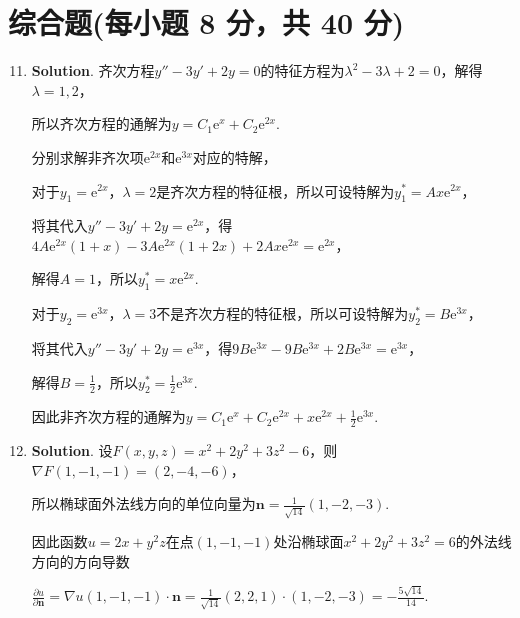 \documentclass[../main.tex]{subfiles}
\begin{document}
\section{综合题(每小题 8 分，共 40 分)}
\begin{enumerate}
    \setcounter{enumi}{10}

    \item \textbf{Solution}. 齐次方程$y''-3y'+2y = 0$的特征方程为$\lambda^{2}-3\lambda
              +2=0$，解得$\lambda = 1,2$，

          所以齐次方程的通解为$y = C_{1}\mathrm{e}^{x}+ C_{2}\mathrm{e}^{2x}$.

          分别求解非齐次项$\mathrm{e}^{2x}$和$\mathrm{e}^{3x}$对应的特解，

          对于$y_{1}=\mathrm{e}^{2x}$，$\lambda = 2$是齐次方程的特征根，所以可设特解为$y
                  _{1}^{*}= Ax\mathrm{e}^{2x}$，

          将其代入$y''-3y'+2y = \mathrm{e}^{2x}$，得$4A\mathrm{e}^{2x}(1+x)-3A\mathrm{e}
              ^{2x}(1+2x)+2A x\mathrm{e}^{2x}= \mathrm{e}^{2x}$，

          解得$A = 1$，所以$y_{1}^{*}= x\mathrm{e}^{2x}$.

          对于$y_{2}=\mathrm{e}^{3x}$，$\lambda = 3$不是齐次方程的特征根，所以可设特解为$y
                  _{2}^{*}= B\mathrm{e}^{3x}$，

          将其代入$y''-3y'+2y = \mathrm{e}^{3x}$，得$9B\mathrm{e}^{3x}-9B\mathrm{e}^{3x}
              +2B\mathrm{e}^{3x}= \mathrm{e}^{3x}$，

          解得$B = \frac{1}{2}$，所以$y_{2}^{*}= \frac{1}{2}\mathrm{e}^{3x}$.

          因此非齐次方程的通解为$y = C_{1}\mathrm{e}^{x}+ C_{2}\mathrm{e}^{2x}+ x\mathrm{e}
              ^{2x}+ \frac{1}{2}\mathrm{e}^{3x}$.

    \item \textbf{Solution}. 设$F(x,y,z) = x^{2}+2y^{2}+3z^{2}-6$，则$\nabla F(1,
              -1,-1) = (2, -4, -6)$，

          所以椭球面外法线方向的单位向量为$\boldsymbol{n}= \frac{1}{\sqrt{14}}(1, -2,
              -3)$.

          因此函数$u=2x+y^{2} z$在点$(1,-1,-1)$处沿椭球面$x^{2}+2y^{2}+3z^{2}=6$的外法线方向的方向导数

          $\frac{\partial u}{\partial \boldsymbol{n}}= \nabla u(1,-1,-1)\cdot \boldsymbol
              {n}= \frac{1}{\sqrt{14}}(2, 2, 1)\cdot (1, -2, -3) = -\frac{5\sqrt{14}}{14}$.


\end{enumerate}
\end{document}
